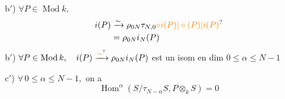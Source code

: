 b$'$) $\forall P\in\operatorname{Mod}k,$
\[
\begin{aligned}
i(P)&\xrightarrow{\sim}\rho_{0N}\tau_{N,0}\unsure{\circ i(P)|\circ(P)|i(P)}\\
&=\rho_{0N}i_N(P)
\end{aligned}
\]
b$'$) $\forall P\in\operatorname{Mod}k,\quad i(P)\xrightarrow{\unsure{\sim}}\rho_{0N}i_N(P)$ est un isom en dim $0\leq\alpha\leq N-1$

c$'$)  $\forall\,0\leq\alpha\leq N-1,$  on a
\[
\operatorname{Hom}^{\alpha}(S/\tau_{N-\alpha}S,P\otimes_k S)=0
\]

